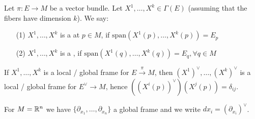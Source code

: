 \begin{definition*}
    Let \(\pi:E\to M\) be a vector bundle. Let \(X^1,\dots,X^k\in \Gamma(E)\) (assuming that the fibers have dimension \(k\)).
    We say: 
    \begin{enumerate}
        \item[(1)] \(X^1,\dots,X^k\) is a  at \(p\in M\), if \(\text{span}(X^1(p),\dots,X^k(p))=E_p\)
        \item[(2)]  \(X^1,\dots,X^k\) is a , if \(\text{span}(X^1(q),\dots,X^k(q))=E_q,\forall q\in M\)
    \end{enumerate}
\end{definition*}

 If \(X^1,\dots, X^k\) is a local / global frame for \(E\stackrel{\pi}{\to}M\), then 
\((X^{1})^\vee,\dots,(X^{k})^\vee\) is a local / global frame for \(E^\vee \to M\), hence \(((X^i(p))^\vee)(X^j(p))=\delta_{ij}\).

\begin{example}
    For \(M=\mathbb{R}^n\) we have \(\{\partial_{x_1},\dots,\partial_{x_n}\}\) a global frame and we write 
    \(dx_i=(\partial_{x_i})^\vee\).
\end{example}